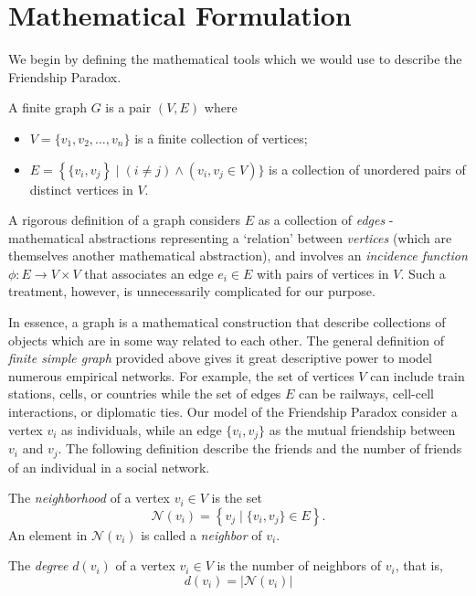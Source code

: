 \documentclass[12pt,reqno, a4]{amsart}
\begin{document}
\section{Mathematical Formulation}
    We begin by defining the mathematical tools which we would use to describe the Friendship Paradox.
\begin{definition}
    A finite graph $G$ is a pair $(V, E)$ where
    \begin{itemize}
        \item $V = \{v_1,v_2, \dots, v_n\}$ is a finite collection of vertices;
        \item $E = \left \{\{v_i,v_j \right \} \mid (i \neq j) \land  (v_i, v_j \in V)\}$ is a collection of unordered pairs of distinct vertices in $V$.
    \end{itemize}
\end{definition}
\begin{remark}
    A rigorous definition of a graph considers $E$ as a collection of \textit{edges} - mathematical abstractions representing a `relation' between \textit{vertices} (which are themselves another mathematical abstraction), and involves an \textit{incidence function} $\phi: E \to V \times V$ that associates an edge $e_i \in E$ with pairs of vertices in $V$. Such a treatment, however, is unnecessarily complicated for our purpose. 
\end{remark}
In essence, a graph is a mathematical construction that describe collections of objects which are in some way related to each other. The general definition of \textit{finite simple graph} provided above gives it great descriptive power to model numerous empirical networks. For example, the set of vertices $V$ can include train stations, cells, or countries while the set of edges $E$ can be railways, cell-cell interactions, or diplomatic ties. Our model of the Friendship Paradox consider a vertex $v_i$ as individuals, while an edge $\{v_i, v_j\}$ as the mutual friendship between $v_i$ and $v_j$. The following definition describe the friends and the number of friends of an individual in a social network. 
\begin{definition}[Neighborhood]
    The \textit{neighborhood} of a vertex $v_i \in V$ is the set 
    \[
    \mathcal{N}(v_i) = \left \{v_j \mid \{v_i, v_j \} \in E\right  \}.
    \]
    An element in $\mathcal{N}(v_i)$ is called a \textit{neighbor} of $v_i$.
\end{definition}
\begin{definition}
    The \textit{degree} $d(v_i)$ of a vertex $v_i \in V$ is the number of neighbors of $v_i$, that is,
    \[d(v_i) =  \left | \mathcal{N}(v_i) \right | \]
\end{definition}
\end{document}
